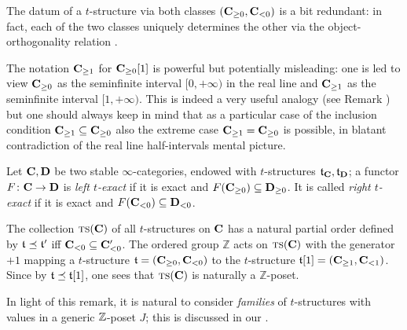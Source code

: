 \begin{remark}\label{determines.the.other}
The datum of a $t$\hyp{}structure via both classes $(\mathbf{C}_{\ge 0}, \mathbf{C}_{<0})$ is a bit redundant: in fact, each of the two classes uniquely determines the other via the object\hyp{}orthogonality relation .
\end{remark}
\begin{remark}
\marginnote{\textdbend} 
The notation $\mathbf{C}_{\geq 1}$ for $\mathbf{C}_{\geq 0}[1]$ is powerful but potentially misleading: one is led to view $\mathbf{C}_{\geq 0}$ as the seminfinite interval $[0,+\infty)$ in the real line and $\mathbf{C}_{\geq 1}$ as the seminfinite interval $[1,+\infty)$. This is indeed a very useful analogy (see Remark ) but one should always keep in mind that as a particular case of the inclusion condition $\mathbf{C}_{\geq 1}\subseteq \mathbf{C}_{\geq 0}$ also the extreme case $\mathbf{C}_{\geq 1}=\mathbf{C}_{\geq 0}$ is possible, in blatant contradiction of the real line half\hyp{}intervals mental picture.
\end{remark}
\begin{definition}\label{t.exact.func}
Let $\mathbf{C},\mathbf{D}$ be two stable $\infty$\hyp{}categories, endowed with $t$\hyp{}structures $\mathfrak{t}_{\mathbf{C}},\mathfrak{t}_{\mathbf{D}}$; a functor $F\colon \mathbf{C} \to \mathbf{D}$ is \emph{left $t$\hyp{}exact} if it is exact and $F(\mathbf{C}_{\ge 0})\subseteq \mathbf{D}_{\ge 0}$. It is called \emph{right $t$\hyp{}exact} if it is exact and $F(\mathbf{C}_{< 0})\subseteq \mathbf{D}_{< 0}$.
\end{definition}
\begin{remark}\label{slicing}
The collection $\text{\scshape ts}(\mathbf{C})$ of all $t$\hyp{}structures on $\mathbf{C}$ has a natural partial order defined by $\mathfrak{t}\preceq \mathfrak{t}'$ iff $\mathbf{C}_{<0}\subseteq \mathbf{C}'_{<0}$. The ordered group $\mathbb{Z}$ acts  on $\text{\scshape ts}(\mathbf{C})$ with the generator  $+1$ mapping a $t$\hyp{}structure $\mathfrak{t}=(\mathbf{C}_{\geq0},\mathbf{C}_{<0})$ to the $t$\hyp{}structure $\mathfrak{t}[1]=(\mathbf{C}_{\geq 1},\mathbf{C}_{<1})$. Since by  $\mathfrak{t}\preceq\mathfrak{t}[1]$, one sees that $\text{\scshape ts}(\mathbf{C})$ is naturally a $\mathbb{Z}$\hyp{}poset.
\end{remark}
In light of this remark, it is natural to consider \emph{families} of $t$\hyp{}structures with values in a generic $\mathbb{Z}$\hyp{}poset $J$; this is discussed in our \achap {}.
